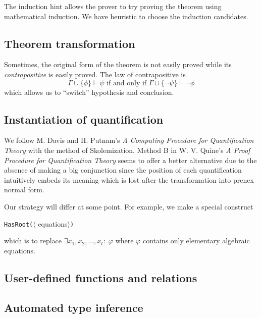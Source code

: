 \documentclass[12pt]{article}
\begin{document}
The induction hint allows the prover to try proving the theorem using mathematical induction. We have heuristic to choose the induction candidates.

\subsection{Theorem transformation}

Sometimes, the original form of the theorem is not easily proved while its \emph{contrapositive} is easily proved. The law of contrapositive is
$$\Gamma \cup \{\phi\} \vdash \psi \text{ if and only if } \Gamma \cup \{\neg \psi\} \vdash \neg \phi$$
which allows us to ``switch'' hypothesis and conclusion.

\subsection{Instantiation of quantification}

We follow M. Davis and H. Putnam's \emph{A Computing Procedure for Quantification Theory} with the method of Skolemization. Method B in W. V. Quine's \emph{A Proof Procedure for Quantification Theory} seems to offer a better alternative due to the absence of making a big conjunction since the position of each quantification intuitively embeds its meaning which is lost after the transformation into prenex normal form.

Our strategy will differ at some point. For example, we make a special construct
\begin{center}
\texttt{HasRoot(}$\langle$ equations$\rangle$\texttt{)}
\end{center}
which is to replace $\exists x_1, x_2, ..., x_t :\; \varphi$ where $\varphi$ contains only elementary algebraic equations.

\subsection{User-defined functions and relations}

\subsection{Automated type inference}

\end{document}
